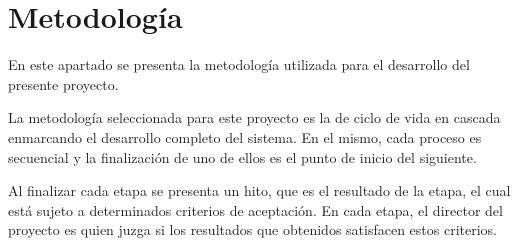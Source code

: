 \section{Metodología}

    \par
    En este apartado se presenta la metodología utilizada para el desarrollo del presente proyecto.
    \par La metodología seleccionada para este proyecto es la de ciclo de vida en cascada enmarcando el desarrollo completo del sistema. En el mismo, cada proceso es secuencial y la finalización de uno de ellos es el punto de inicio del siguiente.
    
    \par Al finalizar cada etapa se presenta un hito, que es el resultado de la etapa, el cual está sujeto a determinados criterios de aceptación. En cada etapa, el director del proyecto es quien juzga si los resultados que obtenidos satisfacen estos criterios.

